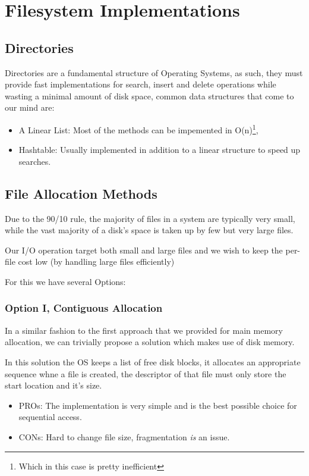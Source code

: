 \documentclass[openright, twoside]{report}
\theoremstyle{definition}
\theoremstyle{example}
\begin{document}
\section{Filesystem Implementations}

\subsection{Directories}
Directories are a fundamental structure of Operating Systems, as such, they 
must provide fast implementations for search, insert and delete operations while 
wasting a minimal amount of disk space, common data structures that come to our mind are:

\begin{itemize}
	\item A Linear List: Most of the methods can be impemented in O(n)\footnote{Which in this case 
	is pretty inefficient}, 
	\item Hashtable: Usually implemented in addition to a linear structure to speed up searches. 
\end{itemize}

\subsection{File Allocation Methods}
Due to the 90/10 rule, the majority of files in a system are typically very small, while 
the vast majority of a disk's space is taken up by few but very large files.

Our I/O operation target both small and large files and we wish to keep 
the per-file cost low (by handling large files efficiently)

For this we have several Options:
\subsubsection{Option I, Contiguous Allocation}
In a similar fashion to the first approach that we provided for main memory allocation, 
we can trivially propose a solution which makes use of disk memory.

In this solution the OS keeps a list of free disk blocks, it allocates an appropriate 
sequence whne a file is created, the descriptor of that file must only store the start
location and it's size.

\begin{itemize}
	\item PROs: The implementation is very simple and is the best possible choice for 
	sequential access.
	\item CONs: Hard to change file size, fragmentation \emph{is} an issue.
\end{itemize}
\end{document}
